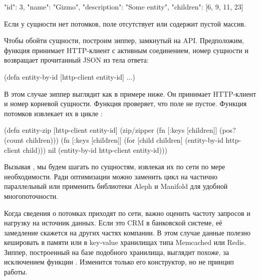 \begin{english}
  \begin{json}
{
  "id": 3,
  "name": "Gizmo",
  "description": "Some entity",
  "children": [6, 9, 11, 23]
}
  \end{json}
\end{english}

Если у сущности нет потомков, поле  отсутствует или содержит
пустой массив.

Чтобы обойти сущности, построим зиппер, замкнутый на API. Предположим, функция
 принимает HTTP-клиент с активным соединением, номер сущности
и возвращает прочитанный JSON из тела ответа:

\begin{english}
  \begin{clojure}
(defn entity-by-id
  [http-client entity-id]
  ...)
  \end{clojure}
\end{english}

В этом случае зиппер выглядит как в примере ниже. Он принимает HTTP-клиент и
номер корневой сущности. Функция  проверяет, что поле  не
пустое. Функция потомков извлекает их в цикле :

\begin{english}
  \begin{clojure}
(defn entity-zip
  [http-client entity-id]
  (zip/zipper
    (fn [{:keys [children]}]
      (pos? (count children)))
    (fn [{:keys [children]}]
      (for [child children]
        (entity-by-id http-client child)))
    nil
    (entity-by-id http-client entity-id)))
  \end{clojure}
\end{english}

Вызывая , мы будем шагать по сущностям, извлекая их по сети по мере
необходимости. Ради оптимизации можно заменить цикл  на частично
параллельный  или применить библиотеки Aleph и Manifold для удобной
многопоточности.


Когда сведения о потомках приходят по сети, важно оценить частоту запросов и
нагрузку на источник данных. Если это CRM в банковской системе, её замедление
скажется на других частях компании. В этом случае данные полезно кешировать в
памяти или в key-value хранилищах типа Memcached или Redis. Зиппер, построенный
на базе подобного хранилища, выглядит похоже, за исключением функции
. Изменится только его конструктор, но не принцип работы.

